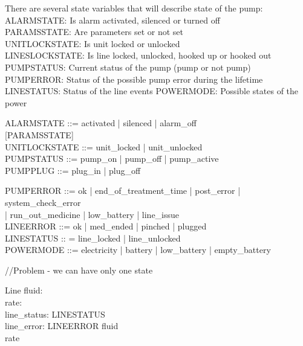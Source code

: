 \documentclass{article}
\begin{document}
	
	There are several state variables that will describe state of the pump:\\
	ALARMSTATE: Is alarm activated, silenced or turned off\\
	PARAMSSTATE: Are parameters set or not set\\
	UNITLOCKSTATE: Is unit locked or unlocked \\
	LINESLOCKSTATE: Is line locked, unlocked, hooked up or hooked out\\
	PUMPSTATUS: Current status of the pump (pump or not pump)\\
	PUMPERROR: Status of the possible pump error during the lifetime\\
	LINESTATUS: Status of the line events
	POWERMODE: Possible states of the power
	
	\begin{zed}	
		
		
		ALARMSTATE ::= activated | silenced | alarm\_off \\
		
		[PARAMSSTATE] \\ %
	
		UNITLOCKSTATE ::= unit\_locked | unit\_unlocked \\
	
		PUMPSTATUS ::= pump\_on | pump\_off | pump\_active \\
		
		PUMPPLUG ::=  plug\_in | plug\_off
		
		PUMPERROR ::= ok | end\_of\_treatment\_time | post\_error | system\_check\_error \\ | run\_out\_medicine | low\_battery | line\_issue \\
		
		LINEERROR ::= ok | med\_ended | pinched | plugged \\
		
		LINESTATUS :: = line\_locked | line\_unlocked \\
		
		POWERMODE ::= electricity | battery | low\_battery | empty\_battery \\
	\end{zed}
	
	//Problem - we can have only one state
	
	\begin{schema}{Line}
		fluid: \nat \\
		rate: \nat \\
		line\_status: LINESTATUS \\
		line\_error: LINEERROR
	\where
		fluid  \\ 
		rate 
	\end{schema}
	
\end{document}

